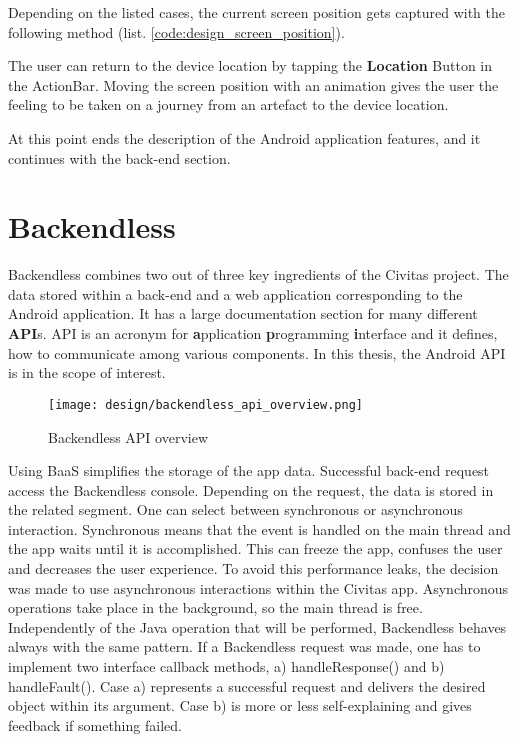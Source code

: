 Depending on the listed cases, the current screen position gets captured with the following method (list. \ref{code:design_screen_position}).

\begin{mdframed}

\end{mdframed}

The user can return to the device location by tapping the \textbf{Location} Button in the ActionBar.
Moving the screen position with an animation gives the user the feeling to be taken on a journey from an artefact to the device location.

At this point ends the description of the Android application features, and it continues with the back-end section. 



\section{Backendless}

Backendless combines two out of three key ingredients of the Civitas project. The data stored within a back-end and a web application corresponding to the Android application. It has a large documentation section for many different \textbf{API}s. API is an acronym for \textbf{a}pplication \textbf{p}rogramming \textbf{i}nterface and it defines, how to communicate among various components. In this thesis, the Android API is in the scope of interest.

\begin{figure}[H]
    \centering \texttt{[image: design/backendless\_api\_overview.png]}
    \caption{Backendless API overview}
    \label{fig:backendless_api_overview}
\end{figure}


Using BaaS simplifies the storage of the app data. Successful back-end request access the Backendless console. Depending on the request, the data is stored in the related segment. One can select between synchronous or asynchronous interaction. Synchronous means that the event is handled on the main thread and the app waits until it is accomplished. This can freeze the app, confuses the user and decreases the user experience. To avoid this performance leaks, the decision was made to use asynchronous interactions within the Civitas app. Asynchronous operations take place in the background, so the main thread is free. 
Independently of the Java operation that will be performed, Backendless behaves always with the same pattern. If a Backendless request was made, one has to implement two interface callback methods, a) handleResponse() and b) handleFault(). Case a) represents a successful request and delivers the desired object within its argument. Case b) is more or less self-explaining and gives feedback if something failed.

